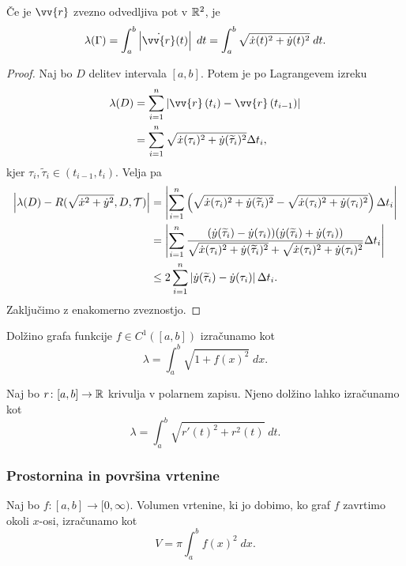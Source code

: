 \documentclass[12pt, a4paper]{article}
\begin{document}
\begin{izrek}
Če je $\vv{r}$ zvezno odvedljiva pot v $\mathbb{R}^2$, je
\[
\lambda(\Gamma)=\int_a^b \abs{\dot{\vv{r}}(t)}\;dt=\int_a^b\sqrt{\dot{x}(t)^2+\dot{y}(t)^2}\;dt.
\]
\end{izrek}

\begin{proof}
Naj bo $D$ delitev intervala $[a,b]$. Potem je po Lagrangevem izreku
\begin{align*}
\lambda(D)&=\sum_{i=1}^n\abs{\vv{r}\left(t_i\right)-\vv{r}\left(t_{i-1}\right)}
\\
&=\sum_{i=1}^n\sqrt{\dot{x}(\tau_i)^2+\dot{y}(\widetilde{\tau}_i)^2}\Delta t_i,
\end{align*}
kjer $\tau_i,\widetilde{\tau}_i\in(t_{i-1},t_i)$. Velja pa
\begin{align*}
\left\lvert \lambda(D)-R(\sqrt{\dot{x}^2+\dot{y}^2},D,\mathcal{T})\right\rvert&=\left\lvert \sum_{i=1}^n\left(\sqrt{\dot{x}(\tau_i)^2+\dot{y}(\widetilde{\tau}_i)^2}-\sqrt{\dot{x}(\tau_i)^2+\dot{y}(\tau_i)^2}\right)\Delta t_i\right\rvert
\\
&=\left\lvert \sum_{i=1}^n\frac{(\dot{y}(\widetilde{\tau}_i)-\dot{y}(\tau_i))(\dot{y}(\widetilde{\tau}_i)+\dot{y}(\tau_i))}{\sqrt{\dot{x}(\tau_i)^2+\dot{y}(\widetilde{\tau}_i)^2}+\sqrt{\dot{x}(\tau_i)^2+\dot{y}(\tau_i)^2}}\Delta t_i\right\rvert
\\
&\leq 2\sum_{i=1}^n\left\lvert \dot{y}(\widetilde{\tau}_i)-\dot{y}(\tau_i)\right\rvert\Delta t_i.
\end{align*}
Zaključimo z enakomerno zveznostjo.
\end{proof}

\begin{posledica}
Dolžino grafa funkcije $f\in C^1([a,b])$ izračunamo kot
\[
\lambda=\int_a^b \sqrt{1+f(x)^2}\;dx.
\]
\end{posledica}

\begin{posledica}
Naj bo $r\colon[a,b]\to\mathbb{R}$ krivulja v polarnem zapisu. Njeno dolžino lahko izračunamo kot
\[
\lambda=\int_a^b\sqrt{r'(t)^2+r^2(t)}\;dt.
\]
\end{posledica}

\obvs

\subsubsection{Prostornina in površina vrtenine}

\begin{trditev}
Naj bo $f\colon[a,b]\to[0,\infty)$. Volumen vrtenine, ki jo dobimo, ko graf $f$ zavrtimo okoli $x$-osi, izračunamo kot
\[
V=\pi\int_a^b f(x)^2\;dx.
\]
\end{trditev}
\end{document}
